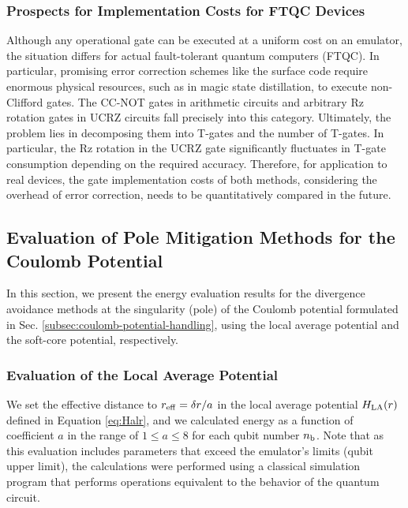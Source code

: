 \documentclass[aip-draft.tex]{subfiles}
\begin{document}
\subsubsection{Prospects for Implementation Costs for FTQC Devices}
Although any operational gate can be executed at a uniform cost on an emulator,
the situation differs for actual fault-tolerant quantum computers (FTQC). In
particular, promising error correction schemes like the surface code require
enormous physical resources, such as in magic state distillation, to execute
non-Clifford gates. The CC-NOT gates in arithmetic circuits and arbitrary Rz
rotation gates in UCRZ circuits fall precisely into this category. Ultimately,
the problem lies in decomposing them into T-gates and the number of T-gates. In
particular, the Rz rotation in the UCRZ gate significantly fluctuates in T-gate
consumption depending on the required accuracy. Therefore, for application to
real devices, the gate implementation costs of both methods, considering the
overhead of error correction, needs to be quantitatively compared in the future.


\subsection{Evaluation of Pole Mitigation Methods for the Coulomb Potential}
\label{subsec:coulomb-potential-handling-results}
In this section, we present the energy evaluation results for the divergence
avoidance methods at the singularity (pole) of the Coulomb potential formulated
in Sec. \ref{subsec:coulomb-potential-handling}, using the local
average potential and the soft-core potential, respectively.

\subsubsection{Evaluation of the Local Average Potential}
\label{subsubsec:local-average-potential-results}

We set the effective distance to $r_{\mathrm{eff}} = \delta r/a$ in the local average
potential $H_{\mathrm{LA}}(r)$ defined in Equation \eqref{eq:Halr}, and we calculated
energy as a function of coefficient $a$ in the range of $1 \le a \le 8$ for
each qubit number $n_{\mathrm{b}}$. Note that as this evaluation includes parameters
that exceed the emulator's limits (qubit upper limit), the calculations were
performed using a classical simulation program that performs operations
equivalent to the behavior of the quantum circuit.
\end{document}
